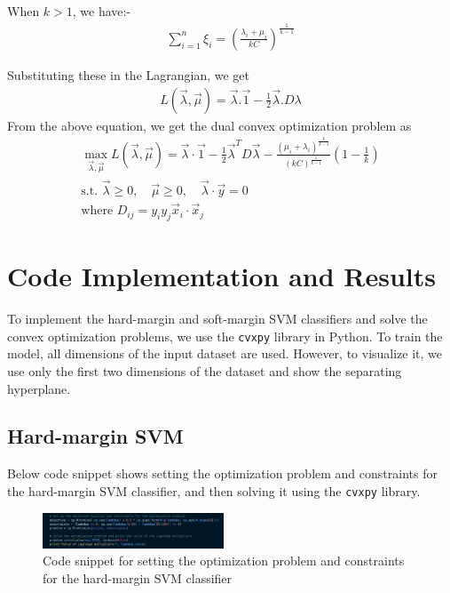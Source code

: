 \documentclass[journal]{IEEEtran}
\begin{document}
When $k > 1$, we have:-
\begin{align}
    \sum_{i=1}^{n} \xi_i = \left(\frac{\lambda_i + \mu_i}{kC}\right)^{\frac{1}{k-1}} 
\end{align}

Substituting these in the Lagrangian, we get  
\begin{align}
    L(\vec{\lambda}, \vec{\mu}) = \vec{\lambda}.\vec{1} - \frac{1}{2}\vec{\lambda}.D{\lambda}
\end{align}
From the above equation, we get the dual convex optimization problem as 
\begin{gather}
    \max_{\vec{\lambda}, \vec{\mu}} L(\vec{\lambda}, \vec{\mu}) = \vec{\lambda}\cdot\vec{1} - \frac{1}{2}\vec{\lambda}^T D\vec{\lambda} - \frac{(\mu_i + \lambda_i)^{\frac{k}{k-1}}}{(kC)^{\frac{1}{k-1}}} \left(1 - \frac{1}{k}\right) \nonumber \\
    \text{s.t. } \vec{\lambda} \geq 0, \quad \vec{\mu} \geq 0, \quad \vec{\lambda} \cdot \vec{y} = 0 \nonumber \\
    \text{where } D_{ij} = y_i y_j \vec{x}_i \cdot \vec{x}_j
\end{gather}

\section{\textbf{Code Implementation and Results}}
To implement the hard-margin and soft-margin SVM classifiers and solve the convex optimization problems, we use the \texttt{cvxpy} library in Python. To train the model, all dimensions of the input dataset are used. However, to visualize it, we use only the first two dimensions of the dataset and show the separating hyperplane.

\subsection*{Hard-margin SVM}
Below code snippet shows setting the optimization problem and constraints for the hard-margin SVM classifier, and then solving it using the \texttt{cvxpy} library.
\begin{figure}[H]
    \centering
    \includegraphics[width=0.48\textwidth]{code-snippet-hard.png}
    \caption{Code snippet for setting the optimization problem and constraints for the hard-margin SVM classifier}
    \label{fig:code1}
\end{figure}
\end{document}
